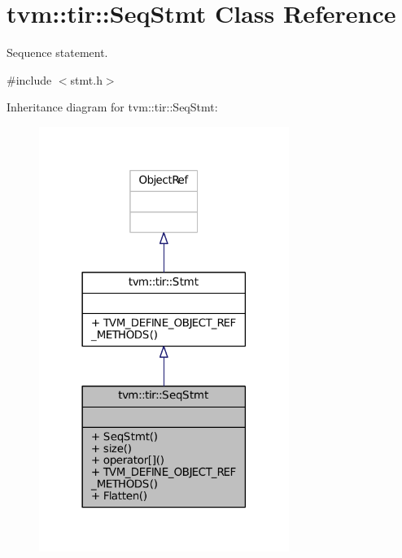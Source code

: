 \hypertarget{classtvm_1_1tir_1_1SeqStmt}{}\section{tvm\+:\+:tir\+:\+:Seq\+Stmt Class Reference}
\label{classtvm_1_1tir_1_1SeqStmt}


Sequence statement.  




{\ttfamily \#include $<$stmt.\+h$>$}



Inheritance diagram for tvm\+:\+:tir\+:\+:Seq\+Stmt\+:
\nopagebreak
\begin{figure}[H]
\begin{center}
\leavevmode
\includegraphics[width=230pt]{classtvm_1_1tir_1_1SeqStmt__inherit__graph}
\end{center}
\end{figure}


